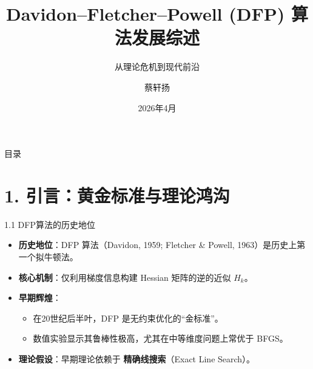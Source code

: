 \documentclass[11pt,hyperref={pdfpagelabels=false}]{beamer}
\title[DFP算法发展综述]{Davidon–Fletcher–Powell (DFP) 算法发展综述}
\subtitle{从理论危机到现代前沿}
\author[蔡轩扬]{蔡轩扬}
\date{2026年4月}
\begin{document}
\begin{frame}
    \titlepage
\end{frame}

\begin{frame}{目录}
    \tableofcontents[hideallsubsections]
\end{frame}

\section{1. 引言：黄金标准与理论鸿沟}

\begin{frame}{1.1 DFP算法的历史地位}
    \begin{itemize}
        \item \textbf{历史地位}：DFP 算法（Davidon, 1959; Fletcher \& Powell, 1963）是历史上第一个拟牛顿法。
        \item \textbf{核心机制}：仅利用梯度信息构建 Hessian 矩阵的逆的近似 $H_k$。
        \item \textbf{早期辉煌}：
        \begin{itemize}
            \item 在20世纪后半叶，DFP 是无约束优化的“金标准”。
            \item 数值实验显示其鲁棒性极高，尤其在中等维度问题上常优于 BFGS。
        \end{itemize}
        \item \textbf{理论假设}：早期理论依赖于 \textbf{精确线搜索}（Exact Line Search）。
    \end{itemize}
\end{frame}
\end{document}
